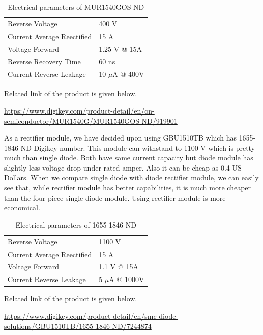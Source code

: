 \documentclass[fleqn, a4paper]{report}
\begin{document}
\begin{table}[H]
\centering
\begin{tabular}{ll}

Reverse Voltage                   & 400 V               \\
Current Average Reectified        & 15 A                \\
Voltage Forward                   & 1.25 V @ 15A        \\
Reverse Recovery Time             & 60 ns       	\\
Current Reverse Leakage           & 10 $\mu$A  @ 400V         
\end{tabular}
\caption{Electrical parameters of MUR1540GOS-ND}
\end{table}
Related link of the product is given below.

\url {https://www.digikey.com/product-detail/en/on-semiconductor/MUR1540G/MUR1540GOS-ND/919901}

As a rectifier module, we have decided upon using GBU1510TB which has 1655-1846-ND Digikey number. This module can withstand to 1100 V which is pretty much than single diode. Both have same current capacity but diode module has slightly less voltage drop under rated amper. Also it can be cheap as 0.4 US Dollars. When we compare single diode with diode rectifier module, we can easily see that, while rectifier module has better capabilities, it is much more cheaper than the four piece single diode module. Using rectifier module is more economical.

\begin{table}[H]
\centering
\begin{tabular}{ll}

Reverse Voltage                   & 1100 V               \\
Current Average Reectified        & 15 A                \\
Voltage Forward                   & 1.1 V @ 15A        \\
Current Reverse Leakage           & 5 $\mu$A  @ 1000V         
\end{tabular}
\caption{Electrical parameters of 1655-1846-ND}
\end{table}
Related link of the product is given below.

\url {https://www.digikey.com/product-detail/en/smc-diode-solutions/GBU1510TB/1655-1846-ND/7244874}
\end{document}
